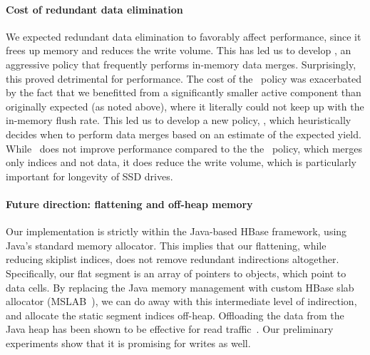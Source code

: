 \paragraph{Cost of redundant data elimination}
We expected redundant data elimination to favorably affect performance, since it frees up memory and reduces the write volume.
This has led us to develop \eager, an aggressive policy that frequently performs in-memory data merges. 
Surprisingly, this proved detrimental for performance. The cost of the \eager\ policy was exacerbated by the 
fact that we benefitted from a significantly smaller active component than originally expected (as noted above),  
where it literally could not keep up with the in-memory flush rate. 
This led us to develop a new policy, \adp, which heuristically decides when to perform data merges based on 
an estimate of the expected yield. 
While \adp\ does not improve performance compared to the the \basic\ policy, which merges only indices and not data,
it does reduce the write volume, which is particularly important for longevity of SSD drives.
 
\paragraph{Future direction: flattening and off-heap memory}
Our implementation is strictly within the Java-based HBase framework, using Java's standard memory allocator.
This implies that our flattening, while reducing skiplist indices, does not remove redundant indirections altogether.
Specifically, our flat segment is an array of pointers to objects, which point to data cells. 
By replacing the Java memory management with custom HBase slab allocator 
(MSLAB~\cite{hbasemslab}), we can do away with this intermediate level of indirection, 
and allocate the static segment indices off-heap. Offloading the data from the Java heap
has been shown to be effective for read traffic~\cite{alibabahbase}. 
Our preliminary experiments show that it is promising  for writes as well.  

